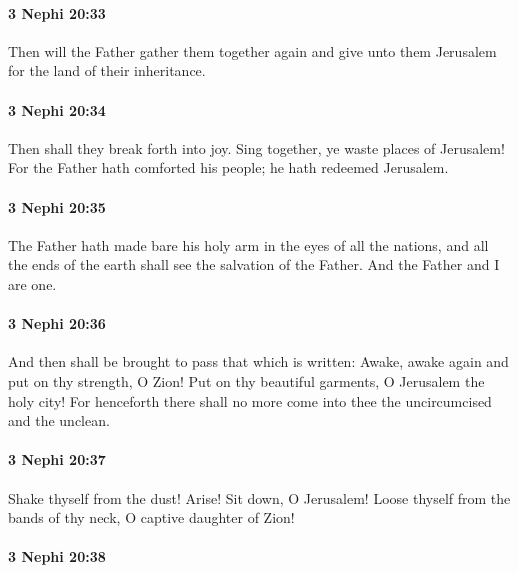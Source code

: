 		\paragraph{3 Nephi 20:33} %
			\label{3NEPHI-20-33}

			Then will the Father gather them together again
			and give unto them Jerusalem for the land of their inheritance.

		\paragraph{3 Nephi 20:34} %
			\label{3NEPHI-20-34}

			Then shall they break forth into joy.
			Sing together, ye waste places of Jerusalem!
			For the Father hath comforted his people;
			he hath redeemed Jerusalem.

		\paragraph{3 Nephi 20:35} %
			\label{3NEPHI-20-35}

			The Father hath made bare his holy arm in the eyes of all the nations,
			and all the ends of the earth shall see the salvation of the Father.
			And the Father and I are one.

		\paragraph{3 Nephi 20:36} %
			\label{3NEPHI-20-36}

			And then shall be brought to pass that which is written:
			Awake, awake again and put on thy strength, O Zion!
			Put on thy beautiful garments, O Jerusalem the holy city!
			For henceforth there shall no more come into thee
			the uncircumcised and the unclean.

		\paragraph{3 Nephi 20:37} %
			\label{3NEPHI-20-37}

			Shake thyself from the dust! Arise!
			Sit down, O Jerusalem!
			Loose thyself from the bands of thy neck, O captive daughter of Zion!

		\paragraph{3 Nephi 20:38} %
			\label{3NEPHI-20-38}

